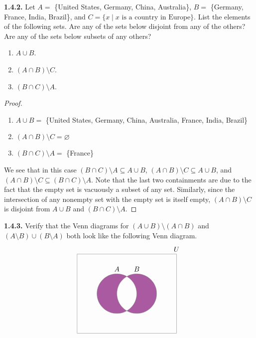 \documentclass[12pt]{amsart}
\newenvironment{statement}[1]{\smallskip\noindent\color[rgb]{.6627, .3529, .6314} {\bf #1.}}{}
\theoremstyle{definition}
\theoremstyle{remark}
\begin{document}
\begin{statement}{1.4.2}
Let $A =$ \{United States, Germany, China, Australia\}, $B =$ \{Germany, France, India, Brazil\}, and $C = \{ x \mid x \text{ is a country in Europe} \}$.
List the elements of the following sets.
Are any of the sets below disjoint from any of the others?
Are any of the sets below subsets of any others?
\begin{enumerate}
	\item $A \cup B$.
	\item $(A \cap B) \setminus C$.
	\item $(B \cap C) \setminus A$.
\end{enumerate}
\end{statement}

\begin{proof}
\hfill
\begin{enumerate}
	\item $A \cup B = $ \{United States, Germany, China, Australia, France, India, Brazil\}
	\item $(A \cap B) \setminus C = \varnothing$ 
	\item $(B \cap C) \setminus A = $ \{France\}
\end{enumerate}
We see that in this case $(B \cap C) \setminus A \subseteq A \cup B$,
$(A \cap B) \setminus C \subseteq A \cup B$, and
$(A \cap B) \setminus C \subseteq (B \cap C) \setminus A$.
Note that the last two containments are due to the fact that the empty set is vacuously a subset of any set.
Similarly, since the intersection of any nonempty set with the empty set is itself empty, $(A \cap B) \setminus C$ is disjoint from $A \cup B$ and $(B \cap C) \setminus A$.
\end{proof}

\begin{statement}{1.4.3}
Verify that the Venn diagrams for $(A \cup B) \setminus (A \cap B)$ and $(A \setminus B) \cup (B \setminus A)$ both look like the following Venn diagram.
\begin{equation*}
	\begin{tikzpicture}[fill=zesty purple]
		\begin{scope}
			\clip (-2, -2) rectangle (2, 2) 
				(1, 0) circle (1);
			\fill (0, 0) circle (1);
		\end{scope}
		\begin{scope}
			\clip (-2, -2) rectangle (2, 2) 
				(0, 0) circle (1);
			\fill (1, 0) circle (1);
		\end{scope}
		\draw[gray] 
			(0, 0) circle (1) 
			(0, 1)  node [text=black, above] {$A$}
			(1, 0) circle (1) 
			(1, 1)  node [text=black, above] {$B$}
			(-2, -2) rectangle 
			(3, 2) node [text=black, above] {$U$};
	\end{tikzpicture}
\end{equation*}
\end{statement}
\end{document}
